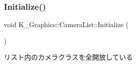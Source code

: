\subsubsection{\texorpdfstring{Initialize()}{Initialize()}}
{\footnotesize\ttfamily void K\+\_\+\+Graphics\+::\+Camera\+List\+::\+Initialize (\begin{DoxyParamCaption}{ }\end{DoxyParamCaption})}



リスト内のカメラクラスを全開放している 

